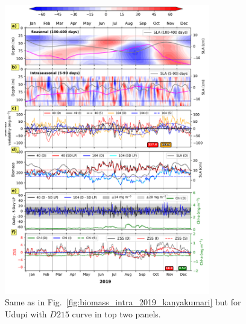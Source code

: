 \documentclass[12pt,a4paper]{article}
\begin{document}
\begin{figure}[htbp]
	\centering
	\includegraphics[width=0.8\textwidth]{./fig_s05_biomass_intra_2019_udupi.pdf} 
	\caption{Same as in Fig.~\ref{fig:biomass_intra_2019_kanyakumari} but for Udupi with $D215$ curve in top two panels.}		
	\label{fig:biomass_intra_2019_udupi}
\end{figure}
\end{document}
